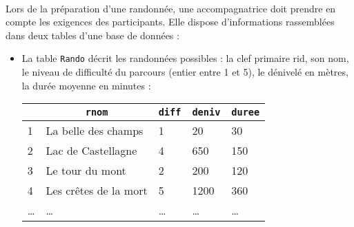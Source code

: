 \documentclass[11pt,a4paper]{article}
\begin{document}
\begin{Exercise}[title={Randonnée},origin={\bac \; d'après {\sc ccmp 2021 - pc, pc psi} (Partie 1)}]\\
	Lors de la préparation d'une randonnée, une accompagnatrice doit prendre en compte les exigences des participants. Elle dispose d'informations rassemblées dans deux tables d'une base de données :
	\begin{itemize}
		\item La table {\tt Rando} décrit les randonnées possibles : la clef primaire {\ttb rid}, son nom, le niveau de difficulté du parcours (entier entre 1 et 5), le dénivelé en mètres, la durée moyenne en minutes :
		      \begin{center}
			      \begin{tabular}{|l|l|l|l|l|}
				      \hline
				      \rowcolor{lightgray} \multicolumn{1}{|c|}{\ttb{\underline{rid}}} & \multicolumn{1}{|c|}{\textbf{\tt rnom}} & \multicolumn{1}{|c|}{\textbf{\tt diff}} & \multicolumn{1}{|c|}{\tt deniv} & \multicolumn{1}{|c|}{\textbf{\tt duree}} \\
				      \hline
				      1                                                                & La belle des champs                     & 1                                       & 20                              & 30                                       \\
				      \hline
				      2                                                                & Lac de Castellagne                      & 4                                       & 650                             & 150                                      \\
				      \hline
				      3                                                                & Le tour du mont                         & 2                                       & 200                             & 120                                      \\
				      \hline
				      4                                                                & Les crêtes de la mort                   & 5                                       & 1200                            & 360                                      \\
				      \hline
				      \dots                                                            & \dots                                   & \dots                                   & \dots                           & \dots                                    \\

\end{tabular}
\end{center}
\end{itemize}
\end{Exercise}
\end{document}
